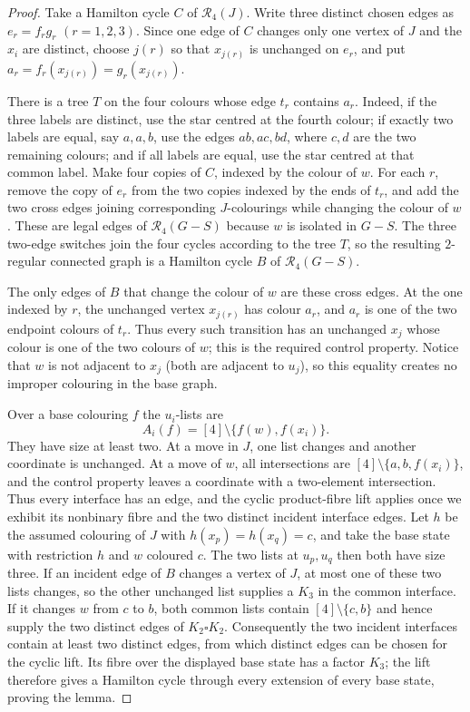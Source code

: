 \documentclass[11pt]{article}
\theoremstyle{remark}
\newcommand{\R}{\mathcal R}
\numberwithin{equation}{section}
\numberwithin{table}{section}
\begin{document}
\begin{proof}
Take a Hamilton cycle $C$ of $\R_4(J)$.  Write three distinct chosen edges
as $e_r=f_rg_r$ $(r=1,2,3)$.  Since one edge of $C$ changes only one vertex
of $J$ and the $x_i$ are distinct, choose $j(r)$ so that $x_{j(r)}$ is
unchanged on $e_r$, and put
$a_r=f_r(x_{j(r)})=g_r(x_{j(r)})$.

There is a tree $T$ on the four colours whose edge $t_r$ contains $a_r$.
Indeed, if the three labels are distinct, use the star centred at the fourth
colour; if exactly two labels are equal, say $a,a,b$, use the edges
$ab,ac,bd$, where $c,d$ are the two remaining colours; and if all labels
are equal, use the star centred at that common label.  Make four copies of
$C$, indexed by the colour of $w$.  For each $r$, remove the copy of $e_r$
from the two copies indexed by the ends of $t_r$, and add the two cross
edges joining corresponding $J$-colourings while changing the colour of
$w$.  These are legal edges of $\R_4(G-S)$ because $w$ is isolated in
$G-S$.  The three two-edge switches join the four cycles according to the
tree $T$, so the resulting $2$-regular connected graph is a Hamilton cycle
$B$ of $\R_4(G-S)$.

The only edges of $B$ that change the colour of $w$ are these cross edges.
At the one indexed by $r$, the unchanged vertex $x_{j(r)}$ has colour $a_r$,
and $a_r$ is one of the two endpoint colours of $t_r$.  Thus every such
transition has an unchanged $x_j$ whose colour is one of the two colours of
$w$; this is the required control property.  Notice that $w$ is not adjacent
to $x_j$ (both are adjacent to $u_j$), so this equality creates no improper
colouring in the base graph.

Over a base colouring $f$ the $u_i$-lists are
\[
 A_i(f)=[4]\setminus\{f(w),f(x_i)\}.
\]
They have size at least two.  At a move in $J$, one list changes and another
coordinate is unchanged.  At a move of $w$, all intersections are
$[4]\setminus\{a,b,f(x_i)\}$, and the control property leaves a coordinate
with a two-element intersection.  Thus every interface has an edge, and the
cyclic product-fibre lift applies once we exhibit its nonbinary fibre and the
two distinct incident interface edges.  Let $h$ be the assumed colouring of
$J$ with $h(x_p)=h(x_q)=c$, and take the base state with restriction $h$ and
$w$ coloured $c$.  The two lists at $u_p,u_q$ then both have size three.  If
an incident edge of $B$ changes a vertex of $J$, at most one of these two
lists changes, so the other unchanged list supplies a $K_3$ in the common
interface.  If it changes $w$ from $c$ to $b$, both common lists contain
$[4]\setminus\{c,b\}$ and hence supply the two distinct edges of
$K_2\square K_2$.  Consequently the two incident interfaces contain at
least two distinct edges, from which distinct edges can be chosen for the
cyclic lift.  Its fibre over the displayed base state has a factor $K_3$;
the lift therefore gives a Hamilton cycle through every extension of every
base state, proving the lemma.
\end{proof}
\end{document}
